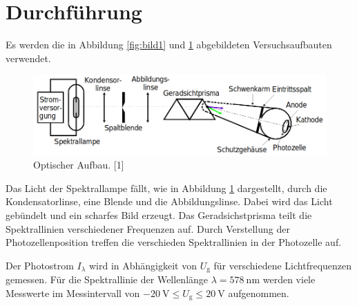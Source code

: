 \section{Durchführung}
\label{sec:Durchführung}

Es werden die in Abbildung \ref{fig:bild1} und \ref{fig:bild2} abgebildeten Versuchsaufbauten verwendet.

\begin{figure}
    \centering
    \includegraphics[scale=0.4]{content/bild2.png}
    \caption{Optischer Aufbau. [1]}
    \label{fig:bild2}
\end{figure}

Das Licht der Spektrallampe fällt, wie in Abbildung \ref{fig:bild2} dargestellt, durch
die Kondensatorlinse, eine Blende und die Abbildungslinse. Dabei wird das Licht gebündelt und ein
scharfes Bild erzeugt. Das Geradsichstprisma teilt die Spektrallinien verschiedener Frequenzen auf.
Durch Verstellung der Photozellenposition treffen die verschieden Spektrallinien in der Photozelle auf.

Der Photostrom $I_\lambda$ wird in Abhängigkeit von $U_\text{g}$ für verschiedene Lichtfrequenzen gemessen.
Für die Spektrallinie der Wellenlänge $\lambda = \SI{578}{\nano\meter}$ werden viele Messwerte im Messintervall
von $\SI{-20}{\volt} \leq U_\text{g} \leq \SI{20}{\volt}$ aufgenommen.
